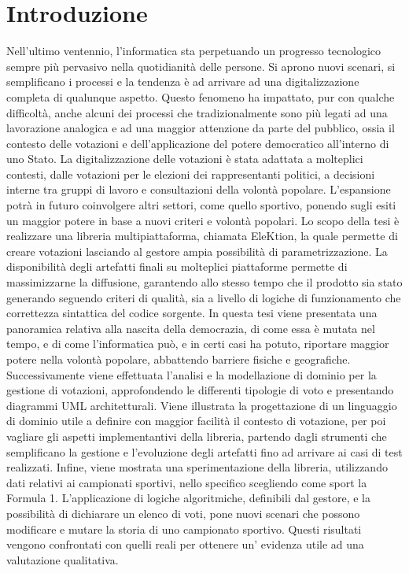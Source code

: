 \documentclass[12pt,a4paper,openright,twoside]{book}
\begin{document}
\chapter{Introduzione}
\label{chap:introduction}
Nell'ultimo ventennio, l'informatica sta perpetuando un progresso tecnologico sempre più pervasivo
nella quotidianità delle persone. Si aprono nuovi scenari, si semplificano i processi 
e la tendenza è ad arrivare ad una digitalizzazione completa di qualunque aspetto.
Questo fenomeno ha impattato, pur con qualche difficoltà, anche alcuni dei processi che tradizionalmente
sono più legati ad una lavorazione analogica e ad una maggior attenzione da parte del pubblico,
ossia il contesto delle votazioni e dell'applicazione del potere democratico all'interno di uno Stato.
La digitalizzazione delle votazioni è stata adattata a molteplici contesti, dalle votazioni per le  
elezioni dei rappresentanti politici, a decisioni interne tra gruppi di lavoro e consultazioni
della volontà popolare. L'espansione potrà in futuro coinvolgere altri settori, come quello sportivo, ponendo sugli esiti un maggior
potere in base a nuovi criteri e volontà popolari.
Lo scopo della tesi è realizzare una libreria multipiattaforma, chiamata EleKtion, la quale permette di creare votazioni
lasciando al gestore ampia possibilità di parametrizzazione.
La disponibilità degli artefatti finali su molteplici piattaforme permette di massimizzarne la diffusione, garantendo
allo stesso tempo che il prodotto sia stato generando seguendo criteri di qualità, sia a livello di logiche di funzionamento
che correttezza sintattica del codice sorgente.
In questa tesi viene presentata una panoramica relativa alla nascita della democrazia, di come essa è mutata nel tempo,
e di come l'informatica può, e in certi casi ha potuto, riportare maggior potere nella volontà popolare, abbattendo barriere
fisiche e geografiche.
Successivamente viene effettuata l'analisi e la modellazione di dominio per la gestione di votazioni,
approfondendo le differenti tipologie di voto e presentando diagrammi UML architetturali.
Viene illustrata la progettazione di un linguaggio di dominio utile a definire con maggior facilità il contesto di votazione,
per poi vagliare gli aspetti implementantivi della libreria, partendo dagli strumenti che semplificano la gestione e l'evoluzione
degli artefatti fino ad arrivare ai casi di test realizzati.
Infine, viene mostrata una sperimentazione della libreria, utilizzando dati relativi ai campionati sportivi, nello specifico
scegliendo come sport la Formula 1. L'applicazione di logiche algoritmiche, definibili dal gestore, e la possibilità
di dichiarare un elenco di voti, pone nuovi scenari che possono modificare e mutare la storia di uno campionato sportivo.
Questi risultati vengono confrontati con quelli reali per ottenere un' evidenza utile ad una valutazione qualitativa.
\end{document}
